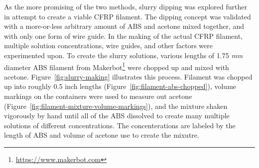 As the more promising of the two methods, slurry dipping was explored further in attempt to create a viable CFRP filament. The dipping concept was validated with a more-or-less arbitrary amount of ABS and acetone mixed together, and with only one form of wire guide. In the making of the actual CFRP filament, multiple solution concentrations, wire guides, and other factors were experimented upon. To create the slurry solutions, various lengths of 1.75 \emph{mm} diameter ABS filament from Makerbot\footnote{\url{https://www.makerbot.com}} were chopped up and mixed with acetone. Figure~\ref{fig:slurry-making} illustrates this process. Filament was chopped up into roughly 0.5 inch lengths (Figure~\ref{fig:filament-abs-chopped}), volume markings on the containers were used to measure out acetone (Figure~\ref{fig:filament-mixture-volume-markings}), and the mixture shaken vigorously by hand until all of the ABS dissolved to create many multiple solutions of different concentrations. The concenterations are labeled by the length of ABS and volume of acetone use to create the mixutre. \\


